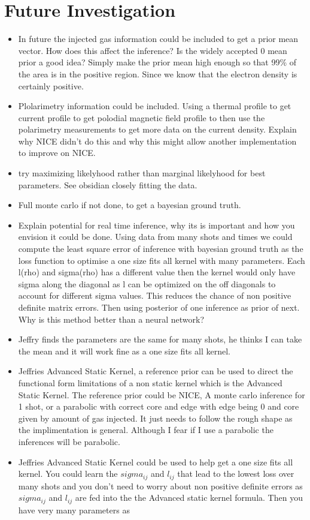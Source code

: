 \chapter{Future Investigation}

\begin{itemize}
    \item In future the injected gas information could be included to get a prior mean vector. How does this affect the inference? Is the widely accepted 0 mean prior a good idea? Simply make the prior mean high enough so that 99\% of the area is in the positive region. Since we know that the electron density is certainly positive. 
    \item Plolarimetry information could be included. Using a thermal profile to get current profile to get polodial magnetic field profile to then use the polarimetry measurements to get more data on the current density. Explain why NICE didn't do this and why this might allow another implementation to improve on NICE.
    \item try maximizing likelyhood rather than marginal likelyhood for best parameters. See obsidian closely fitting the data. 
    \item Full monte carlo if not done, to get a bayesian ground truth.
    \item Explain potential for real time inference, why its is important and how you envision it could be done. Using data from many shots and times we could compute the least square error of inference with bayesian ground truth as the loss function to optimise a one size fits all kernel with many parameters. Each l(rho) and sigma(rho) has a different value then the kernel would only have sigma along the diagonal as l can be optimized on the off diagonals to account for different sigma values. This reduces the chance of non positive definite matrix errors. Then using posterior of one inference as prior of next. Why is this method better than a neural network?
    \item Jeffry finds the parameters are the same for many shots, he thinks I can take the mean and it will work fine as a one size fits all kernel.
    \item Jeffries Advanced Static Kernel, a reference prior can be used to direct the functional form limitations of a non static kernel which is the Advanced Static Kernel.  The reference prior could be NICE, A monte carlo inference for 1 shot, or a parabolic with correct core and edge with edge being 0 and core given by amount of gas injected. It just needs to follow the rough shape as the implimentation is general. Although I fear if I use a parabolic the inferences will be parabolic. 
    \item Jeffries Advanced Static Kernel could be used to help get a one size fits all kernel. You could learn the $sigma_{ij}$ and $l_{ij}$ that lead to the lowest loss over many shots and you don't need to worry about non positive definite errors as $sigma_{ij}$ and $l_{ij}$ are fed into the the Advanced static kernel formula. Then you have very many parameters as 
 \end{itemize}